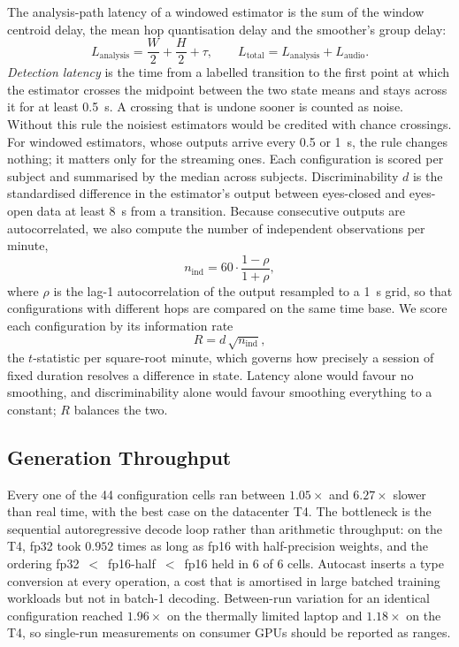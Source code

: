 \documentclass[11pt,a4paper]{article}
\begin{document}
The analysis-path latency of a windowed estimator is the sum of the window centroid delay,
the mean hop quantisation delay and the smoother's group delay:
\begin{equation}
  L_{\mathrm{analysis}} = \frac{W}{2} + \frac{H}{2} + \tau,
  \qquad L_{\mathrm{total}} = L_{\mathrm{analysis}} + L_{\mathrm{audio}} .
  \label{eq:budget}
\end{equation}
\emph{Detection latency} is the time from a labelled transition to the first point at
which the estimator crosses the midpoint between the two state means and stays across it
for at least 0.5~s. A crossing that is undone sooner is counted as noise. Without this rule
the noisiest estimators would be credited with chance crossings. For windowed estimators,
whose outputs arrive every 0.5 or 1~s, the rule changes nothing; it matters only for the
streaming ones. Each configuration is scored per subject and summarised by the median
across subjects. Discriminability $d$ is the standardised difference in the estimator's
output between eyes-closed and eyes-open data at least 8~s from a transition. Because
consecutive outputs are autocorrelated, we also compute the number of independent
observations per minute,
\begin{equation}
  n_{\mathrm{ind}} = 60\cdot\frac{1-\rho}{1+\rho},
  \label{eq:nind}
\end{equation}
where $\rho$ is the lag-1 autocorrelation of the output resampled to a 1~s grid, so that
configurations with different hops are compared on the same time base. We score each
configuration by its information rate
\begin{equation}
  R = d\,\sqrt{n_{\mathrm{ind}}},
  \label{eq:info}
\end{equation}
the $t$-statistic per square-root minute, which governs how precisely a session of fixed
duration resolves a difference in state. Latency alone would favour no smoothing, and
discriminability alone would favour smoothing everything to a constant; $R$ balances the
two.

\subsection{Generation Throughput}

Every one of the 44 configuration cells ran between $1.05\times$ and $6.27\times$ slower
than real time, with the best case on the datacenter T4. The bottleneck is the sequential
autoregressive decode loop rather than arithmetic throughput: on the T4, fp32 took $0.952$
times as long as fp16 with half-precision weights, and the ordering
fp32~$<$~fp16-half~$<$~fp16 held in 6 of 6 cells. Autocast inserts a type conversion at
every operation, a cost that is amortised in large batched training workloads but not in
batch-1 decoding. Between-run variation for an identical configuration reached $1.96\times$
on the thermally limited laptop and $1.18\times$ on the T4, so single-run measurements on
consumer GPUs should be reported as ranges.
\end{document}

